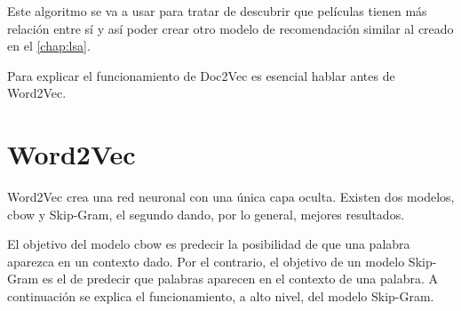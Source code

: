\documentclass[withindex, glossary]{cam-thesis}
\begin{document}
Este algoritmo se va a usar para tratar de descubrir que películas tienen más relación entre sí y así poder crear otro modelo de recomendación similar al creado en el \autoref{chap:lsa}.

Para explicar el funcionamiento de Doc2Vec es esencial hablar antes de Word2Vec.

\section{Word2Vec}
Word2Vec crea una red neuronal con una única capa oculta. Existen dos modelos, \acrfull{cbow} y Skip-Gram, el segundo dando, por lo general, mejores resultados.

El objetivo del modelo \acrshort{cbow} es predecir la posibilidad de que una palabra aparezca en un contexto dado. Por el contrario, el objetivo de un modelo Skip-Gram es el de predecir que palabras aparecen en el contexto de una palabra. A continuación se explica el funcionamiento, a alto nivel, del modelo Skip-Gram.
\end{document}
